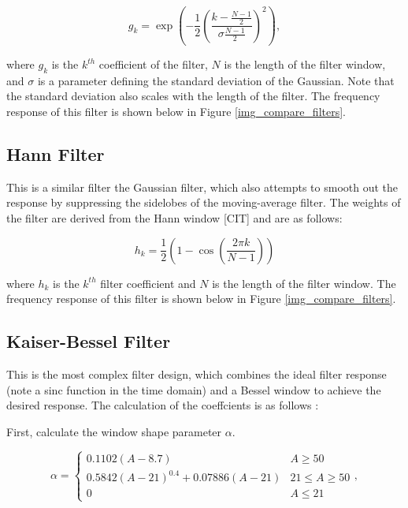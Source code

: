                 \begin{equation}
                    g_k = \exp(-\frac{1}{2}(\frac{k - \frac{N-1}{2}}{\sigma \frac{N-1}{2}})^2),
                \end{equation}

                where $g_k$ is the $k^{th}$ coefficient of the filter, $N$ is the length of the filter window, and $\sigma$ is a parameter defining the standard deviation of the Gaussian. Note that the standard deviation also scales with the length of the filter. The frequency response of this filter is shown below in Figure \ref{img_compare_filters}.

            \subsection{Hann Filter}

                This is a similar filter the Gaussian filter, which also attempts to smooth out the response by suppressing the sidelobes of the moving-average filter. The weights of the filter are derived from the Hann window [CIT] and are as follows: 

                \begin{equation}
                    h_k = \frac{1}{2}(1 - \cos(\frac{2\pi k}{N - 1}))
                \end{equation}

                where $h_k$ is the $k^{th}$ filter coefficient and $N$ is the length of the filter window. The frequency response of this filter is shown below in Figure \ref{img_compare_filters}. 

            \subsection{Kaiser-Bessel Filter}

                This is the most complex filter design, which combines the ideal filter response (note a sinc function in the time domain) and a Bessel window to achieve the desired response. The calculation of the coeffcients is as follows \cite{kaiser-bessel}:

                First, calculate the window shape parameter $\alpha$. 

                \begin{equation}
                    \alpha = 
                        \begin{cases}
                            0.1102(A - 8.7) & A \ge 50 \\
                            0.5842(A-21)^{0.4} + 0.07886(A-21) & 21 \leq A \geq 50 \\
                            0 & A \le 21
                        \end{cases},
                \end{equation}

